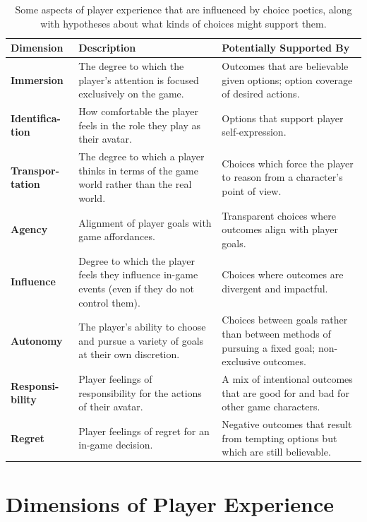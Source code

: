 \begin{table}[!p]
\begingroup
\renewcommand*{\arraystretch}{1.5}
\begin{tabular}{>{\raggedright}p{5.6em}>{\raggedright}p{13.9em}>{\raggedright}p{13.5em}}
\toprule
\textbf{Dimension} & \textbf{Description} & \textbf{Potentially Supported By} \tabularnewline
\midrule
\textbf{Immersion} & The degree to which the player's attention is focused exclusively on the game. & Outcomes that are believable given options; option coverage of desired actions. \tabularnewline
\textbf{Identifica-tion} & How comfortable the player feels in the role they play as their avatar. & Options that support player self-expression. \tabularnewline
\textbf{Transpor-tation} & The degree to which a player thinks in terms of the game world rather than the real world. & Choices which force the player to reason from a character's point of view. \tabularnewline
\textbf{Agency} & Alignment of player goals with game affordances. & Transparent choices where outcomes align with player goals.\tabularnewline
\textbf{Influence} & Degree to which the player feels they influence in-game events (even if they do not control them). & Choices where outcomes are divergent and impactful. \tabularnewline
\textbf{Autonomy} & The player's ability to choose and pursue a variety of goals at their own discretion. & Choices between goals rather than between methods of pursuing a fixed goal; non-exclusive outcomes. \tabularnewline
\textbf{Responsi-bility} & Player feelings of responsibility for the actions of their avatar. & A mix of intentional outcomes that are good for and bad for other game characters. \tabularnewline
\textbf{Regret} & Player feelings of regret for an in-game decision. & Negative outcomes that result from tempting options but which are still believable. \tabularnewline
\bottomrule
\end{tabular}
\endgroup
\caption[Dimensions of player experience]{Some aspects of player experience that are influenced by choice poetics, along with hypotheses about what kinds of choices might support them.}
\label{tab:dimensions-of-experience}
\end{table}


\section{Dimensions of Player Experience}

